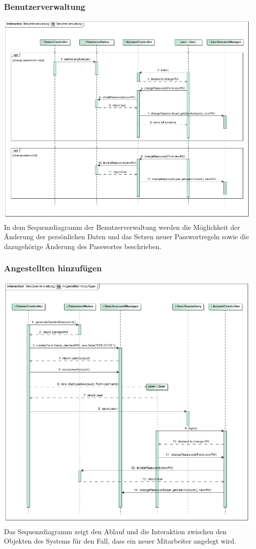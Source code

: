 \documentclass[pdftex,12pt,a4paper]{article}
\begin{document}
\subsubsection*{Benutzerverwaltung}
\includegraphics[width=1\textwidth]{../../Entwurf/benutzerverwaltung_ood}
In dem Sequenzdiagramm der Benutzerverwaltung werden die M\"oglichkeit der \"Anderung der pers\"onlichen Daten und das Setzen neuer Passwortregeln sowie die dazugeh\"orige \"Anderung des Passwortes beschrieben.
\subsubsection*{Angestellten hinzuf\"ugen}
\includegraphics[width=1\textwidth]{../../Entwurf/angestellten_hinzufuegen_ood}
Das Sequenzdiagramm zeigt den Ablauf und die Interaktion zwischen den Objekten des Systems f\"ur den Fall, dass ein neuer Mitarbeiter angelegt wird.
\end{document}
